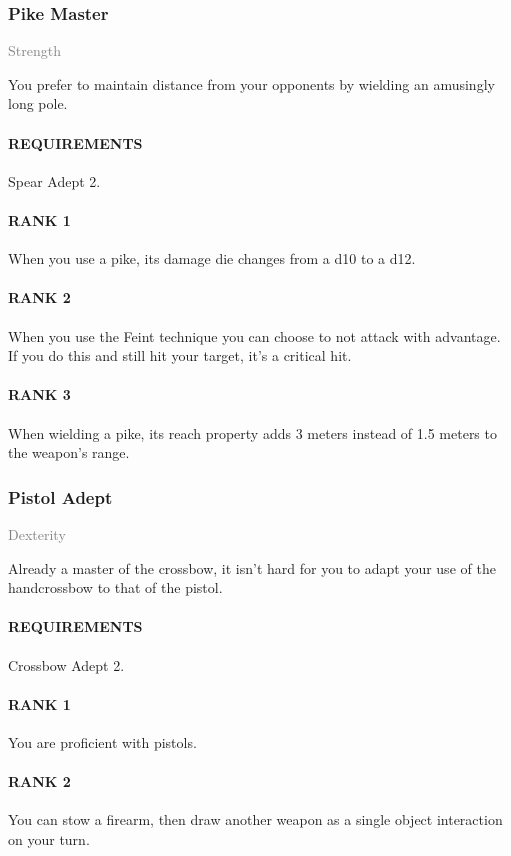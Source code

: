 \subsubsection{Pike Master} \label{feat::pikemaster}
\small{\textcolor{gray}{Strength}}

\normalsize
You prefer to maintain distance from your opponents by wielding an amusingly long pole.
\paragraph{REQUIREMENTS} Spear Adept 2.
\paragraph{RANK 1} When you use a pike, its damage die changes from a d10 to a d12.
\paragraph{RANK 2} When you use the Feint technique you can choose to not attack with advantage.
If you do this and still hit your target, it's a critical hit.
\paragraph{RANK 3} When wielding a pike, its reach property adds 3 meters instead of 1.5 meters to the weapon's range.

\subsubsection{Pistol Adept} \label{feat::pistoladept}
\small{\textcolor{gray}{Dexterity}}

\normalsize
Already a master of the crossbow, it isn't hard for you to adapt your use of the handcrossbow to that of the pistol.
\paragraph{REQUIREMENTS} Crossbow Adept 2.
\paragraph{RANK 1} You are proficient with pistols.
\paragraph{RANK 2} You can stow a firearm, then draw another weapon as a single object interaction on your turn.
